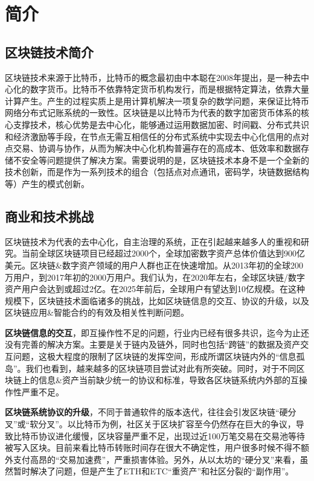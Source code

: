 \section{简介}

\subsection{区块链技术简介}
区块链技术来源于比特币，比特币的概念最初由中本聪在2008年提出，是一种去中心化的数字货币。比特币不依靠特定货币机构发行，而是根据特定算法，依靠大量计算产生。产生的过程实质上是用计算机解决一项复杂的数学问题，来保证比特币网络分布式记账系统的一致性。区块链是以比特币为代表的数字加密货币体系的核心支撑技术，核心优势是去中心化，能够通过运用数据加密、时间戳、分布式共识和经济激励等手段，在节点无需互相信任的分布式系统中实现去中心化信用的点对点交易、协调与协作，从而为解决中心化机构普遍存在的高成本、低效率和数据存储不安全等问题提供了解决方案。需要说明的是，区块链技术本身不是一个全新的技术创新，而是作为一系列技术的组合（包括点对点通讯，密码学，块链数据结构等）产生的模式创新。

\subsection{商业和技术挑战}
区块链技术为代表的去中心化，自主治理的系统，正在引起越来越多人的重视和研究。当前全球区块链项目已经超过2000个，全球加密数字资产总体价值达到900亿美元。区块链\&数字资产领域的用户人群也正在快速增加。从2013年初的全球200万用户，到2017年初的2000万用户。我们认为，在2020年左右，全球区块链/数字资产用户会达到或超过2亿。在2025年前后，全球用户有望达到10亿规模。在这种规模下，区块链技术面临诸多的挑战，比如区块链信息的交互、协议的升级，以及区块链应用\&智能合约的有效及相关性判断问题。

\textbf{区块链信息的交互}，即互操作性不足的问题，行业内已经有很多共识，迄今为止还没有完善的解决方案。主要是关于链内及链外，同时也包括“跨链”的数据及资产交互问题，这极大程度的限制了区块链的发挥空间，形成所谓区块链内外的“信息孤岛”。我们也看到，越来越多的区块链项目尝试对此有所突破。同时，对于不同区块链上的信息\&资产当前缺少统一的协议和标准，导致各区块链系统内外部的互操作性严重不足。

\textbf{区块链系统协议的升级}，不同于普通软件的版本迭代，往往会引发区块链“硬分叉”或“软分叉”。以比特币为例，社区关于区块扩容至今仍然存在巨大的争议，导致比特币协议进化缓慢，区块容量严重不足，出现过近100万笔交易在交易池等待被写入区块。目前来看比特币转账时间存在很大不确定性，用户很多时候不得不额外支付高昂的“交易加速费”，严重损害体验。另外，从以太坊的“硬分叉”来看，虽然暂时解决了问题，但是产生了ETH和ETC“重资产”和社区分裂的“副作用”。

